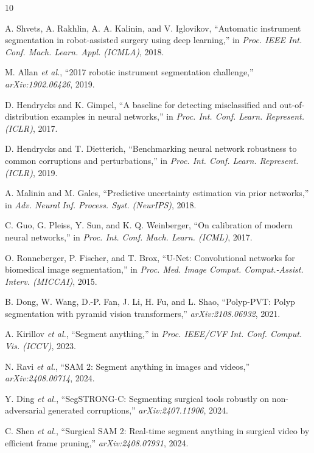 \documentclass[runningheads]{llncs}
\begin{document}
\begin{thebibliography}{10}

 A. Shvets, A. Rakhlin, A. A. Kalinin, and V. Iglovikov,
``Automatic instrument segmentation in robot-assisted surgery using deep
learning,'' in \emph{Proc. IEEE Int. Conf. Mach. Learn. Appl. (ICMLA)}, 2018.

 M. Allan \emph{et al.}, ``2017 robotic instrument
segmentation challenge,'' \emph{arXiv:1902.06426}, 2019.

 D. Hendrycks and K. Gimpel, ``A baseline for
detecting misclassified and out-of-distribution examples in neural
networks,'' in \emph{Proc. Int. Conf. Learn. Represent. (ICLR)}, 2017.

 D. Hendrycks and T. Dietterich, ``Benchmarking
neural network robustness to common corruptions and perturbations,'' in
\emph{Proc. Int. Conf. Learn. Represent. (ICLR)}, 2019.

 A. Malinin and M. Gales, ``Predictive uncertainty
estimation via prior networks,'' in \emph{Adv. Neural Inf. Process. Syst.
(NeurIPS)}, 2018.

 C. Guo, G. Pleiss, Y. Sun, and K. Q. Weinberger, ``On
calibration of modern neural networks,'' in \emph{Proc. Int. Conf. Mach.
Learn. (ICML)}, 2017.

 O. Ronneberger, P. Fischer, and T. Brox, ``U-Net:
Convolutional networks for biomedical image segmentation,'' in \emph{Proc.
Med. Image Comput. Comput.-Assist. Interv. (MICCAI)}, 2015.

 B. Dong, W. Wang, D.-P. Fan, J. Li, H. Fu, and L. Shao,
``Polyp-PVT: Polyp segmentation with pyramid vision transformers,''
\emph{arXiv:2108.06932}, 2021.

 A. Kirillov \emph{et al.}, ``Segment anything,'' in
\emph{Proc. IEEE/CVF Int. Conf. Comput. Vis. (ICCV)}, 2023.

 N. Ravi \emph{et al.}, ``SAM 2: Segment anything in images
and videos,'' \emph{arXiv:2408.00714}, 2024.

 Y. Ding \emph{et al.}, ``SegSTRONG-C: Segmenting
surgical tools robustly on non-adversarial generated corruptions,''
\emph{arXiv:2407.11906}, 2024.

 C. Shen \emph{et al.}, ``Surgical SAM 2: Real-time
segment anything in surgical video by efficient frame pruning,''
\emph{arXiv:2408.07931}, 2024.


\end{thebibliography}
\end{document}

